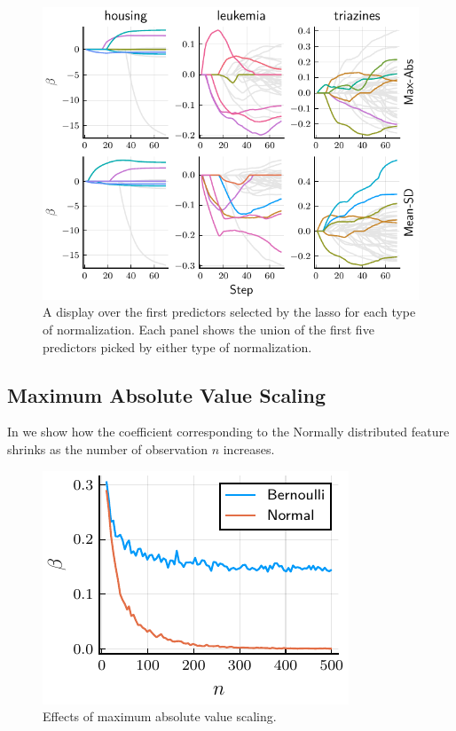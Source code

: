 \begin{figure}[htpb]
  \centering
  \includegraphics[]{plots/realdata_paths.pdf}
  \caption{%
    A display over the first predictors selected by the lasso for each type of normalization. Each panel shows the union of the first five predictors picked by either type of normalization.
  }
  \label{fig:realdata-paths}
\end{figure}

\subsection{Maximum Absolute Value Scaling}

In  we show how the coefficient corresponding to the Normally distributed feature shrinks as the number of observation \(n\) increases.

\begin{figure}[htpb]
  \centering
  \includegraphics[]{plots/maxabs_n.pdf}
  \caption{%
    Effects of maximum absolute value scaling.
  }
  \label{fig:maxabs-n}
\end{figure}

